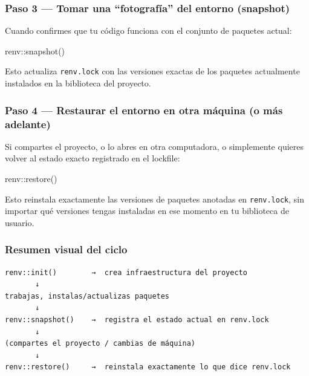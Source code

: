 \documentclass[
  man,
  floatsintext,
  longtable,
  a4paper,
  nolmodern,
  notxfonts,
  notimes,
  12pt,
  colorlinks=true,linkcolor=blue,citecolor=blue,urlcolor=blue]{apa7}
\newenvironment{Shaded}{\begin{snugshade}}{\end{snugshade}}
\newcommand{\FunctionTok}[1]{\textcolor[rgb]{0.28,0.35,0.67}{#1}}
\newcommand{\NormalTok}[1]{\textcolor[rgb]{0.00,0.23,0.31}{#1}}
\newcommand{\SpecialCharTok}[1]{\textcolor[rgb]{0.37,0.37,0.37}{#1}}
\begin{document}
\subsubsection{Paso 3 --- Tomar una ``fotografía'' del entorno
(snapshot)}\label{paso-3-tomar-una-fotografuxeda-del-entorno-snapshot}

Cuando confirmes que tu código funciona con el conjunto de paquetes
actual:

\begin{Shaded}
\begin{Highlighting}[]
\NormalTok{renv}\SpecialCharTok{::}\FunctionTok{snapshot}\NormalTok{()}
\end{Highlighting}
\end{Shaded}

Esto actualiza \texttt{renv.lock} con las versiones exactas de los
paquetes actualmente instalados en la biblioteca del proyecto.

\subsubsection{Paso 4 --- Restaurar el entorno en otra máquina (o más
adelante)}\label{paso-4-restaurar-el-entorno-en-otra-muxe1quina-o-muxe1s-adelante}

Si compartes el proyecto, o lo abres en otra computadora, o simplemente
quieres volver al estado exacto registrado en el lockfile:

\begin{Shaded}
\begin{Highlighting}[]
\NormalTok{renv}\SpecialCharTok{::}\FunctionTok{restore}\NormalTok{()}
\end{Highlighting}
\end{Shaded}

Esto reinstala exactamente las versiones de paquetes anotadas en
\texttt{renv.lock}, sin importar qué versiones tengas instaladas en ese
momento en tu biblioteca de usuario.

\subsubsection{Resumen visual del ciclo}\label{resumen-visual-del-ciclo}

\begin{verbatim}
renv::init()        →  crea infraestructura del proyecto
       ↓
trabajas, instalas/actualizas paquetes
       ↓
renv::snapshot()    →  registra el estado actual en renv.lock
       ↓
(compartes el proyecto / cambias de máquina)
       ↓
renv::restore()     →  reinstala exactamente lo que dice renv.lock
\end{verbatim}
\end{document}
